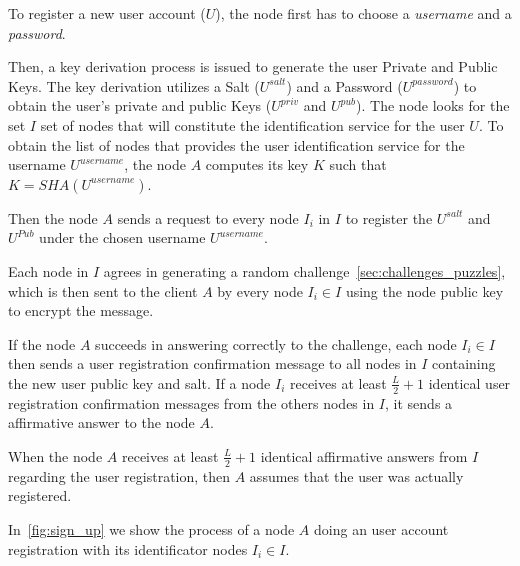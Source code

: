 To register a new user account ($U$), the node first
has to choose a \textit{username} and a \textit{password}.
% 
% 

Then, a key derivation process is issued to generate the user Private and
Public Keys. The
key derivation utilizes a Salt ($U^{salt}$) and a Password ($U^{password}$) to
obtain the user's private and public Keys
($U^{priv}$ and $U^{pub}$).
The node  looks for the set $I$ set of nodes that will constitute the
identification service for the user $U$. To obtain the list of nodes that provides the user identification service for
the username $U^{username}$, the node $A$ computes its key $K$ such that $K =
SHA(U^{username})$. 

Then the node $A$ sends a request to every node $I_i$ in $I$ to register the
$U^{salt}$ and $U^{Pub}$ under the chosen  username  $U^{username}$.

Each node in $I$ agrees in generating a random challenge~\ref{sec:challenges_puzzles}, which is then sent to the
client $A$ by every node $I_i \in I$ using the node public key to encrypt the
message.

If the node $A$ succeeds in answering correctly to the challenge, each node $I_i \in I$ then sends a user registration confirmation message to all nodes
in $I$ containing the new user public key and salt. If a node $I_i$ receives at
least $\frac{L}{2} + 1$ identical user registration confirmation messages from
the others nodes in $I$, it sends a affirmative answer to the node $A$.

When the node
$A$ receives at least $\frac{L}{2} + 1$ identical affirmative answers from
$I$ regarding the user registration, then $A$ assumes that the user was
actually registered.

In~\ref{fig:sign_up} we show the process of a node $A$ doing an user account
registration with its identificator nodes $I_i \in I$.

